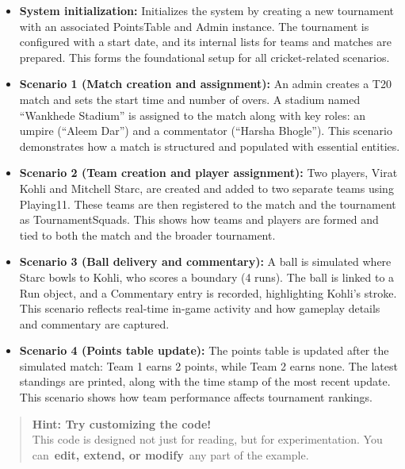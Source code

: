 \begin{itemize}
\item
\protect{}\label{bta-pWoTq2xNurEjbQwtU}
\textbf{System initialization:} Initializes the system by creating a new tournament with an associated PointsTable and Admin instance. The tournament is configured with a start date, and its internal lists for teams and matches are prepared. This forms the foundational setup for all cricket-related scenarios.
\item
\protect{}\label{QGX5PX6hRZTJ_iphu0GZx}
\textbf{Scenario 1 (Match creation and assignment):} An admin creates a T20 match and sets the start time and number of overs. A stadium named ``Wankhede Stadium'' is assigned to the match along with key roles: an umpire (``Aleem Dar'') and a commentator (``Harsha Bhogle''). This scenario demonstrates how a match is structured and populated with essential entities.
\item
\protect{}\label{5K-6GLDqtsP0Gllgz9e8N}
\textbf{Scenario 2 (Team creation and player assignment):} Two players, Virat Kohli and Mitchell Starc, are created and added to two separate teams using Playing11. These teams are then registered to the match and the tournament as TournamentSquads. This shows how teams and players are formed and tied to both the match and the broader tournament.
\item
\protect{}\label{uhkaGmVRGa0hLU5cUImb8}
\textbf{Scenario 3 (Ball delivery and commentary):} A ball is simulated where Starc bowls to Kohli, who scores a boundary (4 runs). The ball is linked to a Run object, and a Commentary entry is recorded, highlighting Kohli's stroke. This scenario reflects real-time in-game activity and how gameplay details and commentary are captured.
\item
\protect{}\label{lZSH5-mzHIs8g6dW6Lcxy}
\textbf{Scenario 4 (Points table update):} The points table is updated after the simulated match: Team 1 earns 2 points, while Team 2 earns none. The latest standings are printed, along with the time stamp of the most recent update. This scenario shows how team performance affects tournament rankings.
\end{itemize}
\begin{quote}
\textbf{Hint: Try customizing the code!}\\
This code is designed not just for reading, but for experimentation. You can~\textbf{edit, extend, or modify}~any part of the example.
\end{quote}

